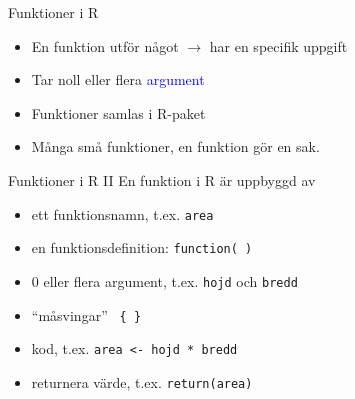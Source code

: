 \documentclass[
  10pt,
  ignorenonframetext,
]{beamer}
\providecommand{\tightlist}{%
  \setlength{\itemsep}{0pt}\setlength{\parskip}{0pt}}
\begin{document}
\begin{frame}{Funktioner i R}
\protect\hypertarget{funktioner-i-r}{}
\begin{itemize}
\tightlist
\item
  En funktion utför något $\rightarrow$ har en specifik uppgift
\item
  Tar noll eller flera \textcolor{blue}{argument}
\item
  Funktioner samlas i R-paket
\item
  Många små funktioner, en funktion gör en sak.
\end{itemize}
\end{frame}

\begin{frame}{Funktioner i R II}
\protect\hypertarget{funktioner-i-r-ii}{}
En funktion i R är uppbyggd av

\begin{itemize}
\tightlist
\item
  ett funktionsnamn, t.ex. \texttt{area}
\item
  en funktionsdefinition: \texttt{function( )}
\item
  0 eller flera argument, t.ex. \texttt{hojd} och \texttt{bredd}
\item
  ``måsvingar'' \texttt{ \{ \} }
\item
  kod, t.ex. \texttt{area <- hojd * bredd}
\item
  returnera värde, t.ex. \texttt{return(area)}
\end{itemize}
\end{frame}
\end{document}
